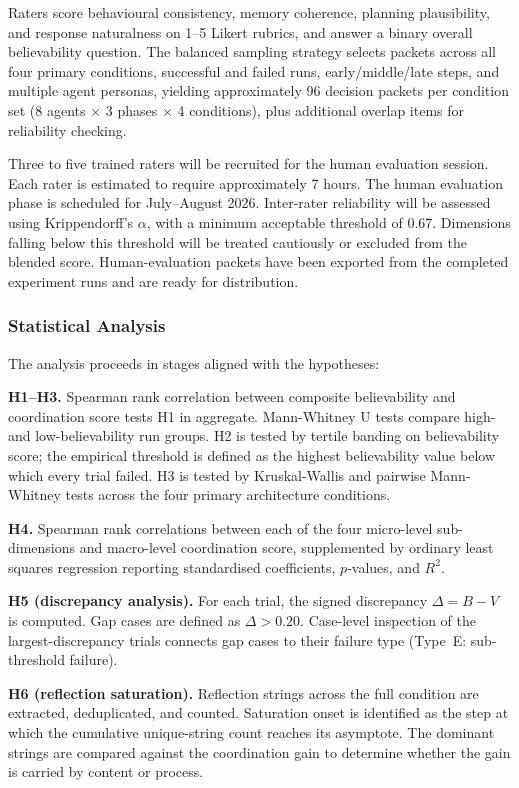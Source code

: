 \documentclass[11pt]{article}
\begin{document}
Raters score behavioural consistency, memory coherence, planning plausibility, and response naturalness on 1--5 Likert rubrics, and answer a binary overall believability question. The balanced sampling strategy selects packets across all four primary conditions, successful and failed runs, early/middle/late steps, and multiple agent personas, yielding approximately 96 decision packets per condition set (8 agents $\times$ 3 phases $\times$ 4 conditions), plus additional overlap items for reliability checking.

Three to five trained raters will be recruited for the human evaluation session. Each rater is estimated to require approximately 7 hours. The human evaluation phase is scheduled for July--August 2026. Inter-rater reliability will be assessed using Krippendorff's $\alpha$, with a minimum acceptable threshold of 0.67. Dimensions falling below this threshold will be treated cautiously or excluded from the blended score. Human-evaluation packets have been exported from the completed experiment runs and are ready for distribution.

\subsubsection{Statistical Analysis}
The analysis proceeds in stages aligned with the hypotheses:

\textbf{H1--H3.} Spearman rank correlation between composite believability and coordination score tests H1 in aggregate. Mann-Whitney U tests compare high- and low-believability run groups. H2 is tested by tertile banding on believability score; the empirical threshold is defined as the highest believability value below which every trial failed. H3 is tested by Kruskal-Wallis and pairwise Mann-Whitney tests across the four primary architecture conditions.

\textbf{H4.} Spearman rank correlations between each of the four micro-level sub-dimensions and macro-level coordination score, supplemented by ordinary least squares regression reporting standardised coefficients, $p$-values, and $R^2$.

\textbf{H5 (discrepancy analysis).} For each trial, the signed discrepancy $\Delta = B - V$ is computed. Gap cases are defined as $\Delta > 0.20$. Case-level inspection of the largest-discrepancy trials connects gap cases to their failure type (Type~E: sub-threshold failure).

\textbf{H6 (reflection saturation).} Reflection strings across the full condition are extracted, deduplicated, and counted. Saturation onset is identified as the step at which the cumulative unique-string count reaches its asymptote. The dominant strings are compared against the coordination gain to determine whether the gain is carried by content or process.
\end{document}
